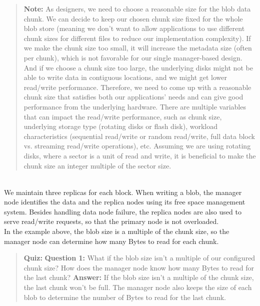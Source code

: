 \begin{quote}
\textbf{Note:} As designers, we need to choose a reasonable size for the blob data chunk. We can decide to keep our chosen chunk size fixed for the whole blob store (meaning we don't want to allow applications to use different chunk sizes for different files to reduce our implementation complexity). If we make the chunk size too small, it will increase the metadata size (often per chunk), which is not favorable for our single manager-based design. And if we choose a chunk size too large, the underlying disks might not be able to write data in contiguous locations, and we might get lower read/write performance. Therefore, we need to come up with a reasonable chunk size that satisfies both our applications' needs and can give good performance from the underlying hardware. There are multiple variables that can impact the read/write performance, such as chunk size, underlying storage type (rotating disks or flash disk), workload characteristics (sequential read/write or random read/write, full data block vs. streaming read/write operations), etc. Assuming we are using rotating disks, where a sector is a unit of read and write, it is beneficial to make the chunk size an integer multiple of the sector size.
\end{quote}
\\
We maintain three replicas for each block. When writing a blob, the manager node identifies the data and the replica nodes using its free space management system. Besides handling data node failure, the replica nodes are also used to serve read/write requests, so that the primary node is not overloaded.
\\
In the example above, the blob size is a multiple of the chunk size, so the manager node can determine how many Bytes to read for each chunk.

\begin{quote}
\textbf{Quiz:}
\textbf{Question 1:} What if the blob size isn't a multiple of our configured chunk size? How does the manager node know how many Bytes to read for the last chunk?
\textbf{Answer:} If the blob size isn't a multiple of the chunk size, the last chunk won't be full. The manager node also keeps the size of each blob to determine the number of Bytes to read for the last chunk.
\end{quote}

